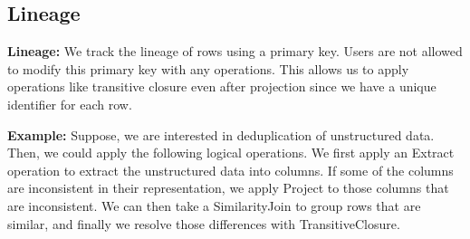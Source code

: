 \subsection{Lineage}

\noindent\textbf{Lineage: }
We track the lineage of rows using a primary key.
Users are not allowed to modify this primary key with any operations.
This allows us to apply operations like transitive closure even after projection since we have a unique identifier for each row.

\vspace{0.5em}
\noindent \textbf{Example: } Suppose, we are interested in deduplication of unstructured data. Then, we could apply the following logical operations.
We first apply an \textsf{Extract} operation to extract the unstructured data into columns. If some of the columns are inconsistent in their representation,
we apply \textsf{Project} to those columns that are inconsistent. We can then take a \textsf{SimilarityJoin} to group rows that are similar, and finally
we resolve those differences with \textsf{TransitiveClosure}.
\fi


